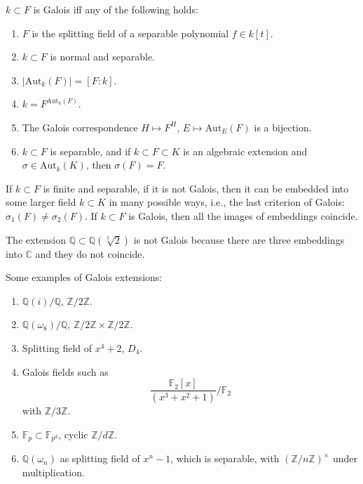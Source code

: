 \documentclass[openany]{book}
\newcommand{\Z}{\mathbb{Z}}
\newcommand{\C}{\mathbb{C}}
\newcommand{\F}{\mathbb{F}}
\newcommand{\Q}{\mathbb{Q}}
\newcommand{\aut}{\text{Aut}}
\newcommand{\om}{\omega}
\begin{document}
\begin{defn}
    $k\subset F$ is Galois iff any of the following holds:
    \begin{enumerate}
        \item $F$ is the splitting field of a separable polynomial $f\in k[t]$.
        \item $k\subset F$ is normal and separable.
        \item $|\aut_k(F)|=[F:k]$.
        \item $k=F^{\aut_k(F)}$.
        \item The Galois correspondence $H\mapsto F^H$, $E\mapsto\aut_E(F)$ is a bijection.
        \item $k\subset F$ is separable, and if $k\subset F\subset K$ is an algebraic extension and $\sigma\in\aut_k(K)$, then $\sigma(F)=F$.
    \end{enumerate}
\end{defn}


\begin{prop}
    If $k\subset F$ is finite and separable, if it is not Galois, then it can be embedded into some larger field $k\subset K$ in many possible ways, i.e., the last criterion of Galois: $\sigma_1(F)\neq\sigma_2(F)$. If $k\subset F$ is Galois, then all the images of embeddings coincide.
\end{prop}

\begin{example}
    The extension $\Q\subset\Q(\sqrt[3]{2})$ is not Galois because there are three embeddings into $\C$ and they do not coincide.
\end{example}


\begin{example}
    Some examples of Galois extensions: 
    \begin{enumerate}
        \item $\Q(i)/\Q$, $\Z/2\Z$.
        \item $\Q(\om_8)/\Q$, $\Z/2\Z\times\Z/2\Z$.
        \item Splitting field of $x^4+2$, $D_4$.
        \item Galois fields such as 
        \begin{equation*}
            \frac{\F_2[x]}{(x^3+x^2+1)}/\F_2
        \end{equation*}
        with $\Z/3\Z$.
        \item $\F_p\subset\F_{p^d}$, cyclic $\Z/d\Z$.
        \item $\Q(\om_n)$ as splitting field of $x^n-1$, which is separable, with $(\Z/n\Z)^\times$ under multiplication.
    \end{enumerate}
\end{example}
\end{document}
